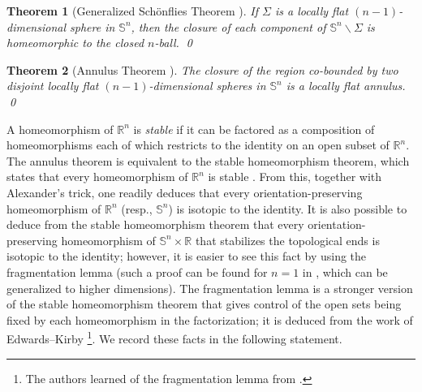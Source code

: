 \documentclass[microtype]{gtpart}
\newcommand{\br}{\mathbb{R}}
\newcommand{\ssm}{\smallsetminus}
\newtheorem{Thm}{Theorem}[section]
\theoremstyle{definition}
\numberwithin{equation}{section}
\begin{document}
\begin{Thm}[Generalized Sch\"onflies Theorem {\cite{Brown1,Brown2}}]
If \( \Sigma \) is a locally flat {\( (n-1) \)-dimensional} sphere in \( \mathbb S^n \), then the closure of each component of \( \mathbb S^n \ssm \Sigma \) is homeomorphic to the closed \( n \)-ball. 
\qed
\end{Thm}

\begin{Thm}[Annulus Theorem {\cite{Kirby,Quinn}}]
The closure of the region co-bounded by two disjoint locally flat \( (n-1) \)-dimensional spheres in \( \mathbb S^n \) is a locally flat annulus.
\qed
\end{Thm}

A homeomorphism of \( \br^n \) is \emph{stable} if it can be factored as a composition of homeomorphisms each of which restricts to the identity on an open subset of \( \br^n \). 
The annulus theorem is equivalent to the stable homeomorphism theorem, which states that every homeomorphism of \( \br^n \) is stable \cite{BrownStable}.
From this, together with Alexander's trick, one readily deduces that every orientation-preserving homeomorphism of \( \mathbb R^n \) (resp., \( \mathbb S^n \)) is isotopic to the identity.  
It is also possible to deduce from the stable homeomorphism theorem that every orientation-preserving homeomorphism of \( \mathbb S^n \times \br \) that stabilizes the topological ends is isotopic to the identity; however, it is easier to see this fact by using  the fragmentation lemma (such a proof can be found for \( n =1 \) in \cite{VlamisHomeomorphism}, which can be generalized to higher dimensions).
The fragmentation lemma is a stronger version of the stable homeomorphism theorem that gives control of the open sets being fixed by each homeomorphism in the factorization; it is deduced from the work of Edwards--Kirby \cite{EdwardsDeformations}\footnote{The authors learned of the fragmentation lemma from \cite{MannAutomatic}.}.
We record these facts in the following statement.
\end{document}
